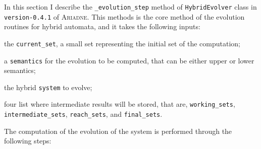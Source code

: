 \documentclass[english,a4paper]{article}
\newcommand{\ARIADNE}{\textsc{Ariadne}\xspace}
\theoremstyle{theorem}
\theoremstyle{definition}
\theoremstyle{remark}
\begin{document}
\noindent In this section I describe the \texttt{\_evolution\_step} method of \texttt{HybridEvolver} class in \texttt{version-0.4.1} of \ARIADNE. This methods is the core method of the evolution routines for hybrid automata, and it takes the following inputs:

\begin{compactitem}
	\item the \texttt{current\_set}, a small set representing the initial set of the computation;
	\item a \texttt{semantics} for the evolution to be computed, that can be either upper or lower semantics;
	\item the hybrid \texttt{system} to evolve;
	\item four list where intermediate results will be stored, that are, \texttt{working\_sets}, \texttt{intermediate\_sets}, \texttt{reach\_sets}, and \texttt{final\_sets}.
\end{compactitem}

The computation of the evolution of the system is performed through the following steps:
\end{document}
